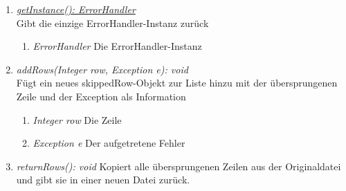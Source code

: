 \begin{enumerate}[+]
	\item \underline{\textit{getInstance(): ErrorHandler}} \\
	Gibt die einzige ErrorHandler-Instanz zurück
	\begin{enumerate}[$\circ$]
 		\item \textit{ErrorHandler} Die ErrorHandler-Instanz
	\end{enumerate}

	\item \textit{addRows(Integer row, Exception e): void} \\
	Fügt ein neues skippedRow-Objekt zur Liste hinzu mit der übersprungenen Zeile und der Exception als Information 
	\begin{enumerate}[$\bullet$]
		\item \textit{Integer row} Die Zeile
		\item \textit{Exception e} Der aufgetretene Fehler
	\end{enumerate}

	\item \textit{returnRows(): void} Kopiert alle übersprungenen Zeilen aus der Originaldatei und gibt sie in einer neuen Datei zurück.
\end{enumerate}

